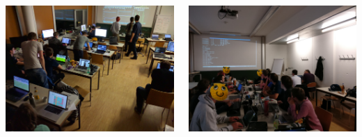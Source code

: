 \begin{frame}[plain]

  \vspace{12em}

  \begin{columns}[T]
    \begin{column}{.6\textwidth}
      \begin{rotate}{-5}
        \includegraphics[width=\textwidth]{../images/ructfe2016-hacking_small.jpg}
      \end{rotate}
    \end{column}
    \begin{column}{.4\textwidth}
      \begin{rotate}{5}
        \includegraphics[width=\textwidth]{../images/r2-training-session_small.jpg}
      \end{rotate}


\end{column}
\end{columns}
\end{frame}
